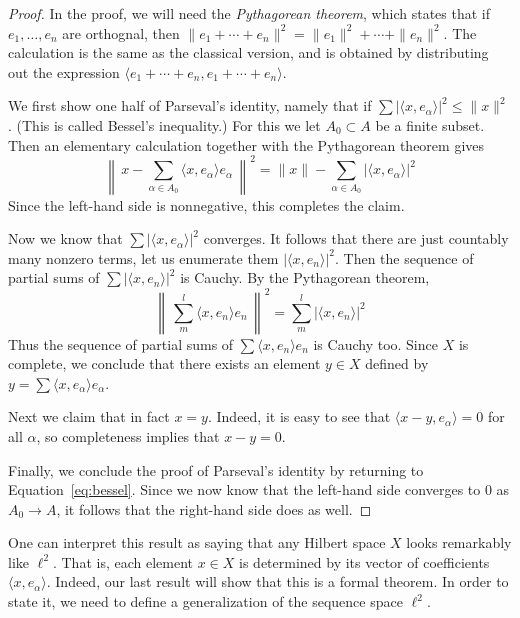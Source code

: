 \documentclass[11pt,oneside]{amsbook}
\theoremstyle{definition}
\theoremstyle{plain}
\theoremstyle{definition}
\theoremstyle{remark}
\numberwithin{equation}{section}
\numberwithin{figure}{section}
\begin{document}
\begin{proof}
  In the proof, we will need the \emph{Pythagorean theorem}, which states that if $e_1,\ldots,e_n$ are orthognal, then $\|e_1+\cdots+e_n\|^2=\|e_1\|^2+\cdots+\|e_n\|^2$. The calculation is the same as the classical version, and is obtained by distributing out the expression $\langle e_1+\cdots+e_n,e_1+\cdots+e_n\rangle$.

  We first show one half of Parseval's identity, namely that if  $\sum|\langle x,e_\alpha\rangle|^2\leq\|x\|^2$. (This is called Bessel's inequality.) For this we let $A_0\subset A$ be a finite subset. Then an elementary calculation together with the Pythagorean theorem gives
  \begin{equation}
    \label{eq:bessel}
    \left\|\,x-\sum_{\alpha\in A_0}\langle x,e_\alpha\rangle e_\alpha\,\right\|^2
    =\|x\|-\sum_{\alpha\in A_0}|\langle x,e_\alpha\rangle|^2
  \end{equation}
  Since the left-hand side is nonnegative, this completes the claim.

  Now we know that $\sum|\langle x,e_\alpha\rangle|^2$ converges. It follows that there are just countably many nonzero terms, let us enumerate them $|\langle x,e_n\rangle|^2$. Then the sequence of partial sums of $\sum|\langle x,e_n\rangle|^2$ is Cauchy. By the Pythagorean theorem,
  \[\left\|\,\sum_m^l\langle x,e_n\rangle e_n\,\right\|^2
    =\sum_m^l|\langle x,e_n\rangle|^2
  \]
  Thus the sequence of partial sums of $\sum\langle x,e_n\rangle e_n$ is Cauchy too. Since $X$ is complete, we conclude that there exists an element $y\in X$ defined by $y=\sum\langle x,e_\alpha\rangle e_\alpha$.

  Next we claim that in fact $x=y$. Indeed, it is easy to see that $\langle x-y,e_\alpha\rangle=0$ for all $\alpha$, so completeness implies that $x-y=0$.

  Finally, we conclude the proof of Parseval's identity by returning to Equation~\eqref{eq:bessel}. Since we now know that the left-hand side converges to $0$ as $A_0\to A$, it follows that the right-hand side does as well.
\end{proof}

One can interpret this result as saying that any Hilbert space $X$ looks remarkably like $\ell^2$. That is, each element $x\in X$ is determined by its vector of coefficients $\langle x,e_\alpha\rangle$. Indeed, our last result will show that this is a formal theorem. In order to state it, we need to define a generalization of the sequence space $\ell^2$.
\end{document}
